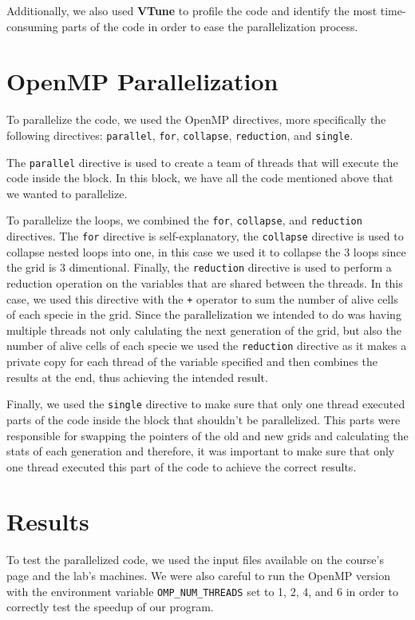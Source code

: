 \documentclass{article}
\begin{document}
Additionally, we also used \textbf{VTune} to profile the code and 
identify the most time-consuming parts of the code in order to ease 
the parallelization process.

\section{OpenMP Parallelization}
To parallelize the code, we used the OpenMP directives, more specifically  
the following directives: \texttt{parallel}, \texttt{for}, \texttt{collapse}, 
\texttt{reduction}, and \texttt{single}.

The \texttt{parallel} directive is used to create a team of threads 
that will execute the code inside the block. In this block, we have 
all the code mentioned above that we wanted to parallelize. 

To parallelize the loops, we combined the \texttt{for}, \texttt{collapse}, 
and \texttt{reduction} directives. The \texttt{for} directive is self-explanatory, 
the \texttt{collapse} directive is used to collapse nested loops into one, in 
this case we used it to collapse the 3 loops since the grid is 3 dimentional.
Finally, the \texttt{reduction} directive is used to perform a reduction 
operation on the variables that are shared between the threads. In this case, we 
used this directive with the \texttt{+} operator to sum the number of alive cells 
of each specie in the grid. Since the parallelization we intended to do was having 
multiple threads not only calulating the next generation of the grid, but also the 
number of alive cells of each specie we used the \texttt{reduction} directive as it 
makes a private copy for each thread of the variable specified and then combines 
the results at the end, thus achieving the intended result. 

Finally, we used the \texttt{single} directive to make sure that only one thread 
executed parts of the code inside the block that shouldn't be parallelized. This 
parts were responsible for swapping the pointers of the old and new grids and calculating the 
stats of each generation and therefore, it was important to make sure that only 
one thread executed this part of the code to achieve the correct results.

\section{Results}

To test the parallelized code, we used the input files available on the course's page 
and the lab's machines. We were also careful to run the OpenMP version with the 
environment variable \texttt{OMP\_NUM\_THREADS} set to 1, 2, 4, and 6 in order to correctly 
test the speedup of our program. 
\end{document}
